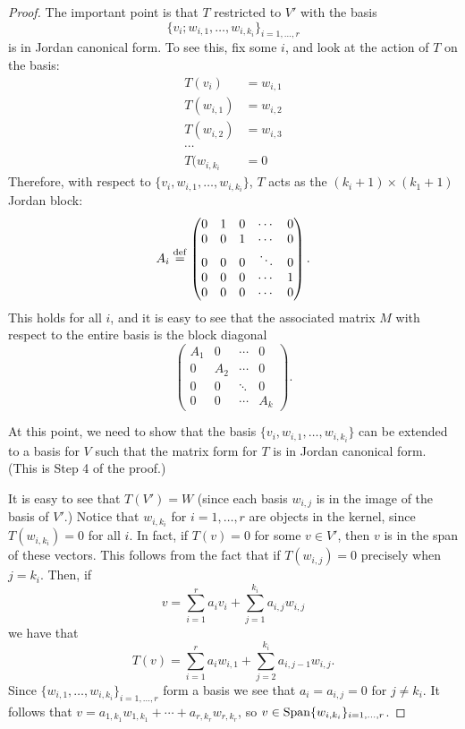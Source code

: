 \begin{proof}
The important point is that $T$ restricted to $V'$ with the basis
\[
\{v_i; w_{i,1},\dots,w_{i,k_i}\}_{i = 1,\dots,r}
\]
is in Jordan canonical form. To see this, fix some $i$, and look 
at the action of $T$ on the basis:
\begin{align*}
T(v_i) &= w_{i,1}\\
T(w_{i,1}) &= w_{i,2}\\
T(w_{i,2}) &= w_{i,3}\\
\cdots \\
T(w_{i,{k_i}} &= 0
\end{align*}
Therefore, with respect to $\{v_i, w_{i,1},\dots,w_{i,k_i}\}$,
$T$ acts as the $(k_i + 1) \times (k_1 + 1)$ Jordan block:
\[
A_i \stackrel{\mathrm{def}}{=}
\left(
\begin{matrix}
0 & 1 & 0 & \cdots & 0\\
0 & 0 & 1 & \cdots & 0\\
0 & 0 & 0 & \ddots & 0\\
0 & 0 & 0 & \cdots & 1\\
0 & 0 & 0 & \cdots & 0
\end{matrix}
\right).
\]
This holds for all $i$, and it is easy to see that the associated
matrix $M$ with respect to the entire basis is the block diagonal
\[
\left(
\begin{matrix}
A_1 &0      &\cdots &0 \\
0   &A_2    &\cdots &0 \\
0 &0 &\ddots &0 \\
0   &0   &\cdots &A_k
\end{matrix}
\right).
\]

At this point, we need to show that the basis 
$\{v_i,w_{i,1},\dots,w_{i,k_i}\}$ can be extended to a basis
for $V$ such that the matrix form for $T$ is in Jordan canonical
form. (This is Step 4 of the proof.)

It is easy to see that $T(V') = W$ (since each basis $w_{i,j}$ is in the
image of the basis of $V'$.) Notice that $w_{i,k_i}$ for $i = 1,\dots,
r$ are objects in the kernel, since $T(w_{i,k_i}) = 0$ for all
$i$. In fact, if $T(v) = 0$ for some $v \in V'$, then $v$ is in
the span of these vectors. This follows from the fact that if 
$T(w_{i,j}) = 0$ precisely when $j = k_i$. Then, if
\[
v = \sum_{i = 1}^r a_iv_i + \sum_{j = 1}^{k_i}a_{i,j}w_{i,j}
\]
we have that
\[
T(v) = \sum_{i = 1}^r a_iw_{i,1} + \sum_{j = 2}^{k_i} a_{i, j-1}w_{i,j}.
\]
Since $\{w_{i,1},\dots,w_{i,k_i}\}_{i = 1,\dots,r}$ form a basis
we see that $a_i = a_{i,j} = 0$ for $j \neq k_i$. It follows that
$v = a_{1,k_1}w_{1,{k_1}} + \cdots + a_{r,{k_r}}w_{r,{k_r}}$, so $v 
\in \mathrm{Span}\{w_{i,{k_i}}\}_{i = 1,\dots,r}$.


\end{proof}
